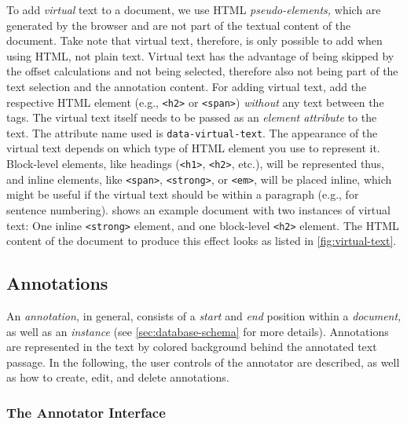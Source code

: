 To add \emph{virtual} text to a document, we use HTML \emph{pseudo-elements,} which are generated by the browser and are not part of the textual content of the document.
Take note that virtual text, therefore, is only possible to add when using HTML, not plain text.
Virtual text has the advantage of being skipped by the offset calculations and not being selected, therefore also not being part of the text selection and the annotation content.
For adding virtual text, add the respective HTML element (e.g., \verb!<h2>! or \verb!<span>!) \emph{without} any text between the tags.
The virtual text itself needs to be passed as an \emph{element attribute} to the text.
The attribute name used is \verb!data-virtual-text!.
The appearance of the virtual text depends on which type of HTML element you use to represent it.
Block-level elements, like headings (\verb!<h1>!, \verb!<h2>!, etc.), will be represented thus, and inline elements, like \verb!<span>!, \verb!<strong>!, or \verb!<em>!, will be placed inline, which might be useful if the virtual text should be within a paragraph (e.g., for sentence numbering).
 shows an example document with two instances of virtual text:
One inline \verb!<strong>! element, and one block-level \verb!<h2>! element.
The HTML content of the document to produce this effect looks as listed in \cref{fig:virtual-text}.


\subsection{Annotations}
\label{sec:annotations}

An \emph{annotation,} in general, consists of a \emph{start} and \emph{end} position within a \emph{document,} as well as an \emph{instance} (see \cref{sec:database-schema} for more details).
Annotations are represented in the text by colored background behind the annotated text passage.
In the following, the user controls of the annotator are described, as well as how to create, edit, and delete annotations.


\subsubsection{The Annotator Interface}
\label{sec:annotation-annotator}

